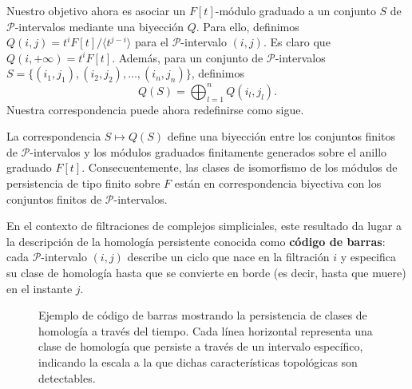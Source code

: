 Nuestro objetivo ahora es asociar un \( F[t] \)-módulo graduado a un conjunto \( S \) de $\mathcal{P}$-intervalos mediante una biyección \( Q \). Para ello, definimos \( Q(i, j) = t^i F[t]/\langle t^{j-i}\rangle \) para el $\mathcal{P}$-intervalo \( (i, j) \). Es claro que \( Q(i, +\infty) = t^i F[t] \). Además, para un conjunto de $\mathcal{P}$-intervalos \( S = \{(i_1, j_1), (i_2, j_2), \ldots, (i_n, j_n)\} \), definimos
\[
Q(S) = \bigoplus_{l=1}^n Q(i_l, j_l).
\]
Nuestra correspondencia puede ahora redefinirse como sigue.

\begin{corolario}
La correspondencia \( S \mapsto Q(S) \) define una biyección entre los conjuntos finitos de $\mathcal{P}$-intervalos y los módulos graduados finitamente generados sobre el anillo graduado \( F[t] \). Consecuentemente, las clases de isomorfismo de los módulos de persistencia de tipo finito sobre \( F \) están en correspondencia biyectiva con los conjuntos finitos de $\mathcal{P}$-intervalos.
\end{corolario}

En el contexto de filtraciones de complejos simpliciales, este resultado da lugar a la descripción de la homología persistente conocida como \textbf{código de barras}: cada $\mathcal{P}$-intervalo $(i, j)$ describe un ciclo que nace en la filtración $i$ y especifica su clase de homología hasta que se convierte en borde (es decir, hasta que muere) en el instante $j$.%

\begin{figure}[h]
	\label{fig:barcode}
	\centering
{}
\caption{Ejemplo de código de barras mostrando la persistencia de clases de homología a través del tiempo. Cada línea horizontal representa una clase de homología que persiste a través de un intervalo específico, indicando la escala a la que dichas características topológicas son detectables.}
\end{figure}

